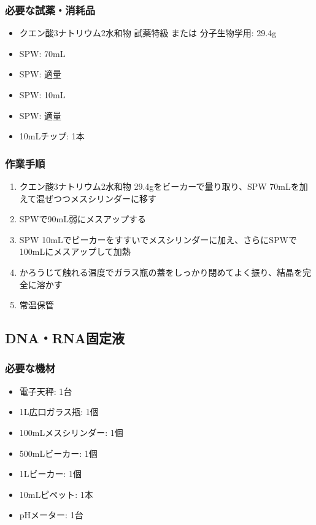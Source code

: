 \documentclass[titlepage,10pt,a4paper,uplatex]{jsbook}
\begin{document}
\subsubsection{必要な試薬・消耗品}
\begin{itemize}
\item クエン酸3ナトリウム2水和物 試薬特級 または 分子生物学用: 29.4g
\item SPW: 70mL
\item SPW: 適量
\item SPW: 10mL
\item SPW: 適量
\item 10mLチップ: 1本
\end{itemize}

\subsubsection{作業手順}
\begin{enumerate}
\item クエン酸3ナトリウム2水和物 29.4gをビーカーで量り取り、SPW 70mLを加えて混ぜつつメスシリンダーに移す
\item SPWで90mL弱にメスアップする
\item SPW 10mLでビーカーをすすいでメスシリンダーに加え、さらにSPWで100mLにメスアップして加熱
\item かろうじて触れる温度でガラス瓶の蓋をしっかり閉めてよく振り、結晶を完全に溶かす
\item 常温保管
\end{enumerate}

\subsection{DNA・RNA固定液}

\subsubsection{必要な機材}
\begin{itemize}
\item 電子天秤: 1台
\item 1L広口ガラス瓶: 1個
\item 100mLメスシリンダー: 1個
\item 500mLビーカー: 1個
\item 1Lビーカー: 1個
\item 10mLピペット: 1本
\item pHメーター: 1台
\end{itemize}
\end{document}
